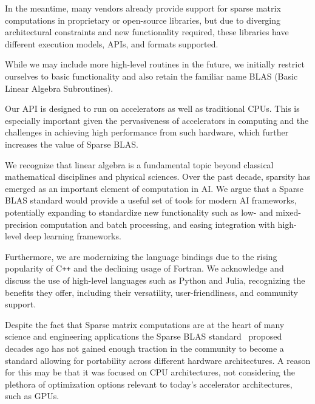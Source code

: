 \documentclass{article}
\newcommand{\cplusplus}{C\texttt{++}\xspace}
\begin{document}
In the meantime, many vendors already provide support for sparse matrix computations in proprietary or open-source libraries, but due to diverging architectural constraints and new functionality required, these libraries have different execution models, APIs, and formats supported. 

While we may include more high-level routines in the future, we initially restrict ourselves to basic functionality and also retain the familiar name BLAS (Basic Linear Algebra Subroutines).



Our API is designed to run on accelerators as well as traditional CPUs. This is especially important given the pervasiveness of accelerators in computing and the challenges in achieving high performance from such hardware, which further increases the value of Sparse BLAS. 

We recognize that linear algebra is a fundamental topic beyond classical mathematical disciplines and physical sciences. Over the past decade, sparsity has emerged as an important element of computation in AI. We argue that a Sparse BLAS standard would provide a useful set of tools for modern AI frameworks, potentially expanding to standardize new functionality such as low- and mixed-precision computation and batch processing, and easing integration with high-level deep learning frameworks.

Furthermore, we are modernizing the language bindings due to the rising
popularity of \cplusplus and the declining usage of Fortran.
We acknowledge and discuss the use of high-level languages such as Python and Julia, recognizing the benefits they offer, including their versatility, user-friendliness, and community support.

\fi




Despite the fact that Sparse matrix computations are at the heart of many science and engineering applications the Sparse BLAS standard~\cite{10.1145/567806.567810} proposed decades ago has not gained enough traction in the community to become a standard allowing for portability across different hardware architectures. A reason for this may be that it was focused on CPU architectures, not considering the plethora of optimization options relevant to today's accelerator architectures, such as GPUs. 
\end{document}
